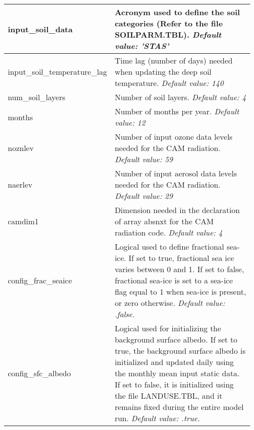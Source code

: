 {\small
\begin{longtable}{|p{2.0in} |p{4.25in}|}
 \hline
  input\_soil\_data         &  Acronym used to define the soil categories \hfill\break (Refer to the file SOILPARM.TBL).  \newline 
  {\em Default value: 'STAS'} \\ \hline  

  input\_soil\_temperature\_lag &  Time lag (number of days) needed when updating the deep soil temperature.  \newline 
  {\em Default value: 140} \\ \hline

  num\_soil\_layers         & Number of soil layers. \newline 
  {\em Default value: 4} \\ \hline 
  
  months         &  Number of months per year. \newline 
  {\em Default value: 12} \\ \hline   
  
  noznlev         &  Number of input ozone data levels needed for the CAM radiation. \newline 
  {\em Default value: 59} \\ \hline
  
  naerlev         &  Number of input aerosol data levels needed for the CAM radiation.  \newline 
  {\em Default value: 29} \\ \hline
  
  camdim1         &  Dimension needed in the declaration of array absnxt for the CAM radiation code. \newline 
  {\em Default value: 4} \\ \hline
         
  config\_frac\_seaice &  Logical used to define fractional sea-ice. If set to true, fractional sea ice varies between 0 and 1. If set to false, fractional sea-ice is set to a sea-ice flag equal to 1 when sea-ice is present, or zero otherwise. \newline 
  {\em Default value: .false.} \\ \hline

  config\_sfc\_albedo & Logical used for initializing the background surface albedo. If set to true, the background surface albedo is initialized and updated daily using the monthly mean input static data. If set to false, it is initialized using the file LANDUSE.TBL, and it remains fixed during the entire model run. \newline 
  {\em Default value: .true.} \\ \hline
  

\end{longtable}}
